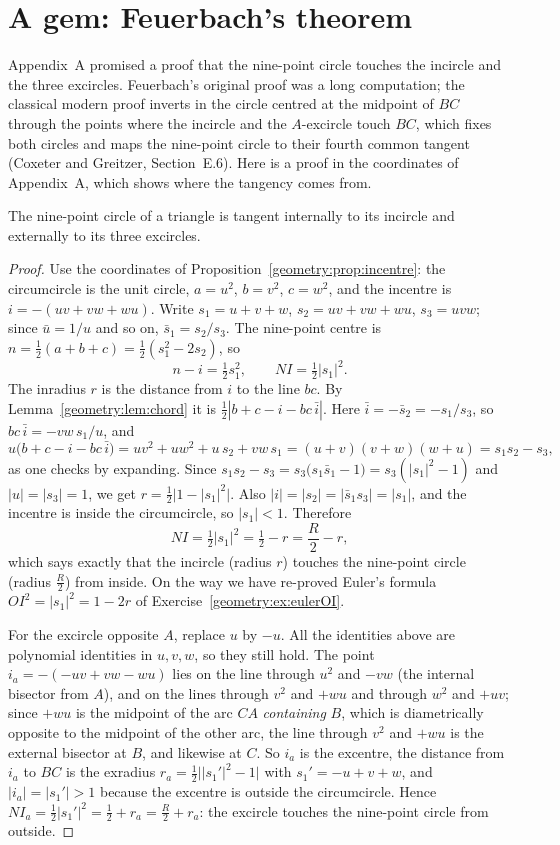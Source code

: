 \section{A gem: Feuerbach's theorem}

Appendix~A promised a proof that the nine-point circle touches the incircle and the three excircles. Feuerbach's original proof was a long
computation; the classical modern proof inverts in the circle centred at the midpoint of $BC$ through the points where the incircle and the
$A$-excircle touch $BC$, which fixes both circles and maps the nine-point circle to their fourth common tangent (Coxeter and Greitzer,
Section~E.6). Here is a proof in the coordinates of Appendix~A, which shows where the tangency comes from.

\begin{theorem}[Feuerbach, 1822]\label{geometry:thm:feuerbach}
The nine-point circle of a triangle is tangent internally to its incircle and externally to its three excircles.
\end{theorem}
\begin{proof}
Use the coordinates of Proposition~\ref{geometry:prop:incentre}: the circumcircle is the unit circle, $a=u^2$, $b=v^2$, $c=w^2$, and the incentre is
$i=-(uv+vw+wu)$. Write $s_1=u+v+w$, $s_2=uv+vw+wu$, $s_3=uvw$; since $\bar u=1/u$ and so on, $\bar s_1=s_2/s_3$. The nine-point centre is
$n=\frac12(a+b+c)=\frac12(s_1^2-2s_2)$, so
\[
n-i=\tfrac12s_1^2,\qquad NI=\tfrac12|s_1|^2.
\]
The inradius $r$ is the distance from $i$ to the line $bc$. By Lemma~\ref{geometry:lem:chord} it is $\frac12|b+c-i-bc\,\bar i|$. Here
$\bar i=-\bar s_2=-s_1/s_3$, so $bc\,\bar i=-vw\,s_1/u$, and
\[
u\bigl(b+c-i-bc\,\bar i\bigr)=u v^2+uw^2+u\,s_2+vw\,s_1=(u+v)(v+w)(w+u)=s_1s_2-s_3,
\]
as one checks by expanding. Since $s_1s_2-s_3=s_3\bigl(s_1\bar s_1-1\bigr)=s_3(|s_1|^2-1)$ and $|u|=|s_3|=1$, we get $r=\frac12\bigl|1-|s_1|^2\bigr|$.
Also $|i|=|s_2|=|\bar s_1s_3|=|s_1|$, and the incentre is inside the circumcircle, so $|s_1|<1$. Therefore
\[
NI=\tfrac12|s_1|^2=\tfrac12-r=\frac R2-r ,
\]
which says exactly that the incircle (radius $r$) touches the nine-point circle (radius $\frac R2$) from inside. On the way we have re-proved
Euler's formula $OI^2=|s_1|^2=1-2r$ of Exercise~\ref{geometry:ex:eulerOI}.

For the excircle opposite $A$, replace $u$ by $-u$. All the identities above are polynomial identities in $u,v,w$, so they still hold. The
point $i_a=-(-uv+vw-wu)$ lies on the line through $u^2$ and $-vw$ (the internal bisector from $A$), and on the lines through $v^2$ and $+wu$ and
through $w^2$ and $+uv$; since $+wu$ is the midpoint of the arc $CA$ \emph{containing} $B$, which is diametrically opposite to the midpoint of
the other arc, the line through $v^2$ and $+wu$ is the external bisector at $B$, and likewise at $C$. So $i_a$ is the excentre, the distance
from $i_a$ to $BC$ is the exradius $r_a=\frac12\bigl||s_1'|^2-1\bigr|$ with $s_1'=-u+v+w$, and $|i_a|=|s_1'|>1$ because the excentre is outside
the circumcircle. Hence $NI_a=\frac12|s_1'|^2=\frac12+r_a=\frac R2+r_a$: the excircle touches the nine-point circle from outside.
\end{proof}

